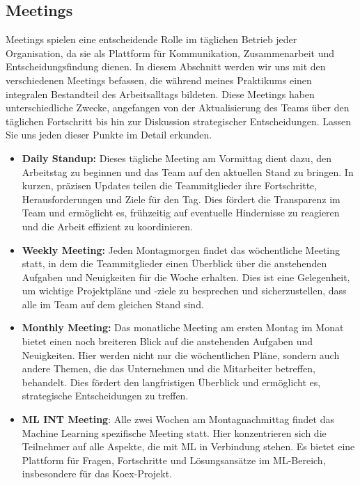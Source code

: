 \documentclass[11pt]{article}
\begin{document}
\subsection{Meetings}
Meetings spielen eine entscheidende Rolle im täglichen Betrieb jeder Organisation, da sie als Plattform für Kommunikation, Zusammenarbeit und Entscheidungsfindung dienen. In diesem Abschnitt werden wir uns mit den verschiedenen Meetings befassen, die während meines Praktikums einen integralen Bestandteil des Arbeitsalltags bildeten. Diese Meetings haben unterschiedliche Zwecke, angefangen von der Aktualisierung des Teams über den täglichen Fortschritt bis hin zur Diskussion strategischer Entscheidungen. Lassen Sie uns jeden dieser Punkte im Detail erkunden.
\begin{itemize}
    \item \textbf{Daily Standup:} \newline
    Dieses tägliche Meeting am Vormittag dient dazu, den Arbeitstag zu beginnen und das Team auf den aktuellen Stand zu bringen. In kurzen, präzisen Updates teilen die Teammitglieder ihre Fortschritte, Herausforderungen und Ziele für den Tag. Dies fördert die Transparenz im Team und ermöglicht es, frühzeitig auf eventuelle Hindernisse zu reagieren und die Arbeit effizient zu koordinieren.
    
    \item \textbf{Weekly Meeting:} \newline
    Jeden Montagmorgen findet das wöchentliche Meeting statt, in dem die Teammitglieder einen Überblick über die anstehenden Aufgaben und Neuigkeiten für die Woche erhalten. Dies ist eine Gelegenheit, um wichtige Projektpläne und -ziele zu besprechen und sicherzustellen, dass alle im Team auf dem gleichen Stand sind.
    
    \item \textbf{Monthly Meeting:} \newline
    Das monatliche Meeting am ersten Montag im Monat bietet einen noch breiteren Blick auf die anstehenden Aufgaben und Neuigkeiten. Hier werden nicht nur die wöchentlichen Pläne, sondern auch andere Themen, die das Unternehmen und die Mitarbeiter betreffen, behandelt. Dies fördert den langfristigen Überblick und ermöglicht es, strategische Entscheidungen zu treffen.
    
    \item \textbf{ML INT Meeting}: \newline
    Alle zwei Wochen am Montagnachmittag findet das Machine Learning spezifische Meeting statt. Hier konzentrieren sich die Teilnehmer auf alle Aspekte, die mit ML in Verbindung stehen. Es bietet eine Plattform für Fragen, Fortschritte und Lösungsansätze im ML-Bereich, insbesondere für das Koex-Projekt.
    

\end{itemize}
\end{document}
